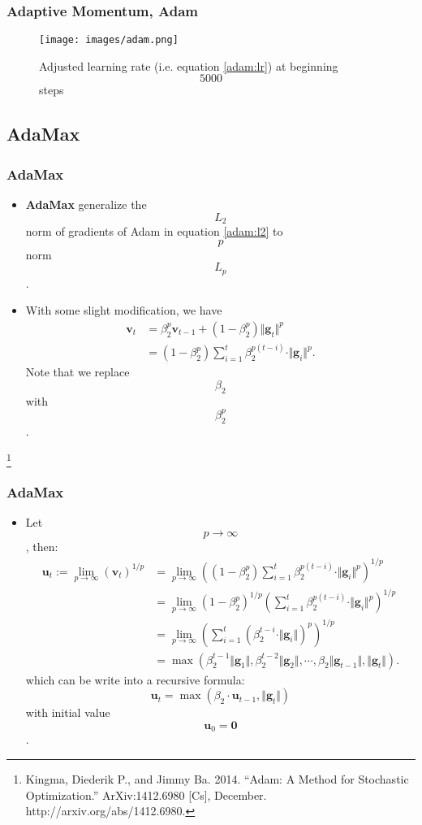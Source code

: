 \documentclass[10pt]{beamer}
\theoremstyle{mystyle}
\def\bb#1{\mathbf{#1}}
\newcommand\blfootnote[1]{%
  \begingroup
  \renewcommand\thefootnote{}\footnote[frame]{#1}%
  \addtocounter{footnote}{-1}%
  \endgroup
}
\theoremstyle{mystyle}
\begin{document}
\begin{frame}
	\frametitle{Adaptive Momentum, Adam}
	\begin{figure}[h]
		\centering
		\texttt{[image: images/adam.png]}
		\caption{Adjusted learning rate (i.e. equation \eqref{adam:lr}) at beginning $$ 5000 $$ steps}
	\end{figure}
\end{frame}

\subsection{AdaMax}
\begin{frame}
	\frametitle{AdaMax}
	\begin{itemize}
		\item {\bf AdaMax} generalize the $$ L_2 $$ norm of gradients of Adam in equation \eqref{adam:l2} to $$ p $$ norm $$ L_p $$.
		\item With some slight modification, we have
		\begin{align}\nonumber
			\bb v_t &= \beta_2^p\bb v_{t-1} + (1-\beta_2^p)\Vert\bb g_t\Vert^p \\
			&= (1-\beta_2^p)\sum_{i=1}^t\beta_2^{p(t-i)}\cdot\Vert\bb g_i\Vert^p.
		\end{align}
		Note that we replace $$ \beta_2 $$ with $$ \beta_2^p $$.
	\end{itemize}

	\blfootnote{Kingma, Diederik P., and Jimmy Ba. 2014. “Adam: A Method for Stochastic Optimization.” ArXiv:1412.6980 [Cs], December. http://arxiv.org/abs/1412.6980.}
\end{frame}

\begin{frame}
	\frametitle{AdaMax}
	\begin{itemize}
		\item Let $$ p\rightarrow\infty $$, then:
		\begin{align}\nonumber
			\bb u_t := \lim_{p\rightarrow\infty}(\bb v_t)^{1/p} &= \lim_{p\rightarrow\infty}\left((1-\beta_2^p)\sum_{i=1}^t\beta_2^{p(t-i)}\cdot\Vert\bb g_i\Vert^p\right)^{1/p} \\ \nonumber
			&= \lim_{p\rightarrow\infty}(1-\beta_2^p)^{1/p}\left(\sum_{i=1}^t\beta_2^{p(t-i)}\cdot\Vert\bb g_i\Vert^p\right)^{1/p} \\ \nonumber
			&= \lim_{p\rightarrow\infty}\left(\sum_{i=1}^t\left(\beta_2^{t-i}\cdot\Vert\bb g_i\Vert\right)^p\right)^{1/p} \\
			&= \max(\beta_2^{t-1}\Vert\bb g_1\Vert, \beta_2^{t-2}\Vert\bb g_2\Vert, \cdots, \beta_2\Vert\bb g_{t-1}\Vert, \Vert\bb g_t\Vert).
		\end{align}
		which can be write into a recursive formula:
		\begin{equation}
			\bb u_t = \max(\beta_2\cdot\bb u_{t-1}, \Vert\bb g_t\Vert)
		\end{equation}
		with initial value $$ \bb u_0 = \bb0 $$.
	\end{itemize}
\end{frame}
\end{document}
